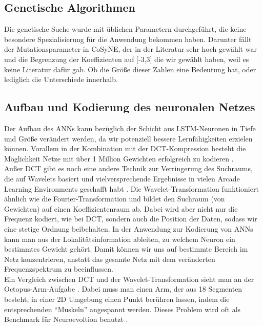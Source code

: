         \subsection*{Genetische Algorithmen}
            Die genetische Suche wurde mit üblichen Parametern durchgeführt, die keine besondere Spezialisierung für die Anwendung bekommen haben. Darunter fällt der Mutationsparameter in CoSyNE, der in der Literatur sehr hoch gewählt war \cite{cosyne2} und die Begrenzung der Koeffizienten auf [-3,3] die wir gewählt haben, weil es keine Literatur dafür gab. Ob die Größe dieser Zahlen eine Bedeutung hat, oder lediglich die Unterschiede innerhalb.

        \subsection*{Aufbau und Kodierung des neuronalen Netzes}
            Der Aufbau des ANNs kann bezüglich der Schicht aus LSTM-Neuronen in Tiefe und Größe verändert werden, da wir potenziell bessere Lernfähigkeiten erzielen können. Vorallem in der Kombination mit der DCT-Kompression besteht die Möglichkeit Netze mit über 1 Million Gewichten erfolgreich zu kodieren \cite{cosyne4}. \\

            \noindent
            Außer DCT gibt es noch eine andere Technik zur Verringerung des Suchraums, die auf Wavelets basiert und vielversprechende Ergebnisse in vielen Arcade Learning Environments geschafft habt \cite{wavelet}. Die Wavelet-Transformation funktioniert ähnlich wie die Fourier-Transformation und bildet den Suchraum (von Gewichten) auf einen Koeffizientenraum ab. Dabei wird aber nicht nur die Frequenz kodiert, wie bei DCT, sondern auch die Position der Daten, sodass wir eine stetige Ordnung beibehalten. In der Anwendung zur Kodierung von ANNs kann man aus der Lokalitätsinformation ableiten, zu welchem Neuron ein bestimmtes Gewicht gehört. Damit können wir uns auf bestimmte Bereich im Netz konzentrieren, anstatt das gesamte Netz mit dem veränderten Frequenzspektrum zu beeinflussen.\\

            \noindent
            Ein Vergleich zwischen DCT und der Wavelet-Transformation sieht man an der Octopus-Arm-Aufgabe \cite{wavelet}. Dabei muss man einen Arm, der aus 18 Segmenten besteht, in einer 2D Umgebung einen Punkt berühren lassen, indem die entsprechenden ``Muskeln'' angespannt werden. Dieses Problem wird oft als Benchmark für Neuroevoltion benutzt \cite{cosyne1}\cite{cosyne4}\cite{wavelet}.

